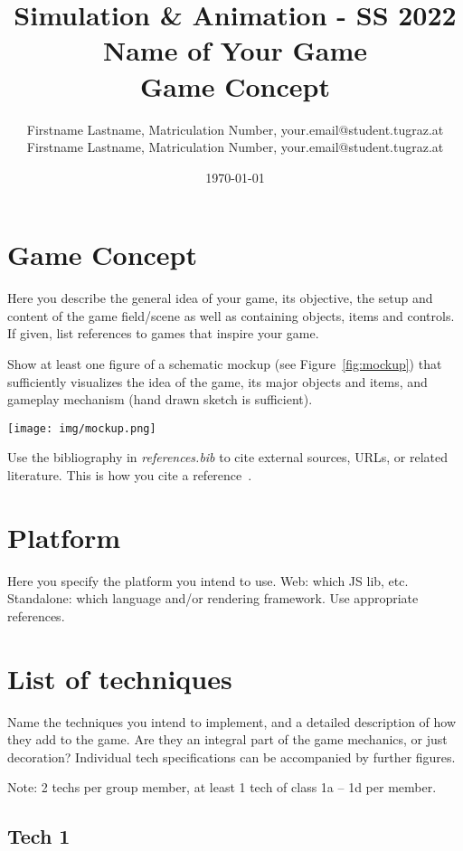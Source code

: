 \documentclass{article}
\title{	
	\large Simulation \& Animation - SS 2022\\
	\Huge{Name of Your Game}\\
	\huge{Game Concept}
}
\author{\parbox{\textwidth}{\centering
	Firstname Lastname, Matriculation Number, your.email@student.tugraz.at\\%
	Firstname Lastname, Matriculation Number, your.email@student.tugraz.at\\%
}}
\date{\today}
\begin{document}
\maketitle

\section{Game Concept}

Here you describe the general idea of your game, its objective, the setup and content of the game field/scene as well as containing objects, items and controls.
If given, list references to games that inspire your game.

Show at least one figure of a schematic mockup (see Figure~\ref{fig:mockup}) that sufficiently visualizes the idea of the game, its major objects and items, and gameplay mechanism (hand drawn sketch is sufficient). 

\begin{figure*}[h]
\centering
\texttt{[image: img/mockup.png]}
\caption{Mockup of the game scene (source: ''Flight control``)}
\label{fig:mockup}
\end{figure*}

Use the bibliography in \emph{references.bib} to cite external sources, URLs, or related literature. This is how you cite a reference~\cite{McGuire2012}.

\section{Platform}

Here you specify the platform you intend to use. Web: which JS lib, etc. Standalone: which language and/or rendering framework. Use appropriate references.


\section{List of techniques}

Name the techniques you intend to implement, and a detailed description of how they add to the game. Are they an integral part of the game mechanics, or just decoration? Individual tech specifications can be accompanied by further figures.

Note: 2 techs per group member, at least 1 tech of class 1a -- 1d per member.

\subsection{Tech 1}
\end{document}
